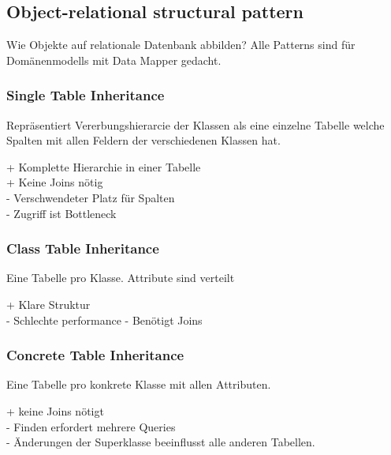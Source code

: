 \subsection{Object-relational structural pattern}
Wie Objekte auf relationale Datenbank abbilden?
Alle Patterns sind für Domänenmodells mit Data Mapper gedacht.
\subsubsection{Single Table Inheritance}
Repräsentiert Vererbungshierarcie der Klassen als eine einzelne Tabelle welche Spalten mit allen
Feldern der verschiedenen Klassen hat.

+ Komplette Hierarchie in einer Tabelle\\
+ Keine Joins nötig \\
- Verschwendeter Platz für Spalten\\
- Zugriff ist Bottleneck

\subsubsection{Class Table Inheritance}
Eine Tabelle pro Klasse. Attribute sind verteilt

+ Klare Struktur \\
- Schlechte performance
- Benötigt Joins
\subsubsection{Concrete Table Inheritance}
Eine Tabelle pro konkrete Klasse mit allen Attributen.


+ keine Joins nötigt \\
- Finden erfordert mehrere Queries \\
- Änderungen der Superklasse beeinflusst alle anderen Tabellen.
